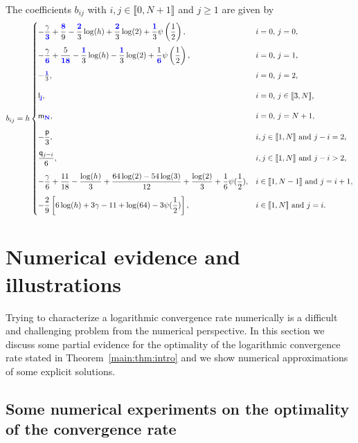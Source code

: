 \documentclass[11 pt]{article}
\newcommand\blue[1]{{\color{blue}\textbf{#1}}}
\newcommand\inter[1]{\llbracket #1\rrbracket}
\numberwithin{equation}{section}
\begin{document}
The coefficients $b_{ij}$ with $i,j\in\inter{0,N+1}$ and $j\geq 1$ are given by
%
\begin{equation}\label{stiff:LogLap}
b_{ij}= h
\begin{cases}
\displaystyle -\frac{\gamma }{\blue{3}}+\frac{\blue{8}}{9}-\frac{\blue{2}}{3}  \log (h)+\frac{\blue{2}}{3}  \log
   (2)+\frac{\blue{1}}{3}  \psi \left(\frac{1}{2}\right), & \textnormal{$i=0$, $j=0$,} \\[4mm]
\displaystyle -\frac{\gamma }{\blue{6}}+\frac{5}{\blue{18}}-\frac{\blue{1}}{3} \log (h)-\frac{\blue{1}}{3}  \log
   (2)+\frac{1}{\blue{6}} \psi \left(\frac{1}{2}\right), & \textnormal{$i=0$, $j=1$,} \\[4mm]
   -\frac{\blue{1}}{3},
 & \parbox[t]{.3\columnwidth}{$i=0$, $j=2$,}\\[4mm]
 \mathsf{l}_{\blue{j}}, 
 & \parbox[t]{.3\columnwidth}{$i=0$, $j\in\inter{3,N}$,}\\[4mm]
 \mathsf{m}_{\blue{N}}, &  \parbox[t]{.3\columnwidth}{$i=0$, $j=N+1$,}\\[4mm]
\displaystyle -\frac{\mathsf p}{3}, & \textnormal{$i,j\in\inter{1,N}$ and $j-i=2$,} \\[4mm]
\displaystyle \frac{\mathsf q_{j-i}}{6}, & \textnormal{$i,j\in\inter{1,N}$ and $j-i> 2$,} \\[4mm]
\displaystyle -\frac{\gamma}{6} + \frac{11}{18} - \frac{\log(h)}{3}  + \frac{64\log(2) - 54\log(3)}{12} + \frac{\log(2)}{3}  + \frac{1}{6} \psi(\frac 12), & \textnormal{$i\in\inter{1,N-1}$ and $j=i+1$,} \\[4mm]
\displaystyle -\frac{2}{9}\left[6\log(h) + 3\gamma - 11 + \log(64) - 3\psi(\frac12)\right], & \textnormal{$i\in\inter{1,N}$ and $j=i$.}
\end{cases}
\end{equation}



\section{Numerical evidence and illustrations}\label{sec:numerics}

Trying to characterize a logarithmic convergence rate numerically is a difficult and challenging problem from the numerical perspective. In this section we discuss some partial evidence for the optimality of the logarithmic convergence rate stated in Theorem~\ref{main:thm:intro} and we show numerical approximations of some explicit solutions.

\subsection{Some numerical experiments on the optimality of the convergence rate}
\end{document}
